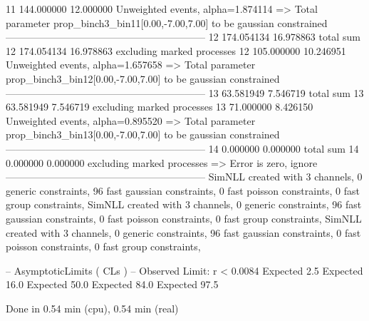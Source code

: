 11         144.000000      12.000000       Unweighted events, alpha=1.874114
  => Total parameter prop_binch3_bin11[0.00,-7.00,7.00] to be gaussian constrained
------------------------------------------------------------
12         174.054134      16.978863       total sum                     
12         174.054134      16.978863       excluding marked processes    
12         105.000000      10.246951       Unweighted events, alpha=1.657658
  => Total parameter prop_binch3_bin12[0.00,-7.00,7.00] to be gaussian constrained
------------------------------------------------------------
13         63.581949       7.546719        total sum                     
13         63.581949       7.546719        excluding marked processes    
13         71.000000       8.426150        Unweighted events, alpha=0.895520
  => Total parameter prop_binch3_bin13[0.00,-7.00,7.00] to be gaussian constrained
------------------------------------------------------------
14         0.000000        0.000000        total sum                     
14         0.000000        0.000000        excluding marked processes    
  => Error is zero, ignore      
------------------------------------------------------------
SimNLL created with 3 channels, 0 generic constraints, 96 fast gaussian constraints, 0 fast poisson constraints, 0 fast group constraints, 
SimNLL created with 3 channels, 0 generic constraints, 96 fast gaussian constraints, 0 fast poisson constraints, 0 fast group constraints, 
SimNLL created with 3 channels, 0 generic constraints, 96 fast gaussian constraints, 0 fast poisson constraints, 0 fast group constraints, 

 -- AsymptoticLimits ( CLs ) --
Observed Limit: r < 0.0084
Expected  2.5%
Expected 16.0%
Expected 50.0%
Expected 84.0%
Expected 97.5%

Done in 0.54 min (cpu), 0.54 min (real)
